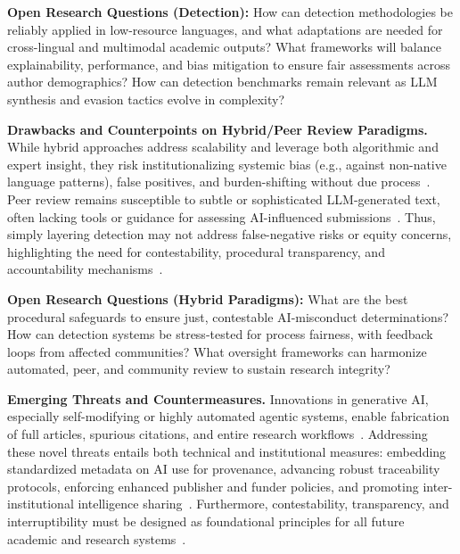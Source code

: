\documentclass[sigconf]{acmart}
\begin{document}
\textbf{Open Research Questions (Detection):}
How can detection methodologies be reliably applied in low-resource languages, and what adaptations are needed for cross-lingual and multimodal academic outputs?
What frameworks will balance explainability, performance, and bias mitigation to ensure fair assessments across author demographics?
How can detection benchmarks remain relevant as LLM synthesis and evasion tactics evolve in complexity?

\textbf{Drawbacks and Counterpoints on Hybrid/Peer Review Paradigms.}
While hybrid approaches address scalability and leverage both algorithmic and expert insight, they risk institutionalizing systemic bias (e.g., against non-native language patterns), false positives, and burden-shifting without due process~\cite{ref14,ref41,ref97,ref100}. Peer review remains susceptible to subtle or sophisticated LLM-generated text, often lacking tools or guidance for assessing AI-influenced submissions~\cite{ref14,ref24,ref80,ref85,ref92,ref97,ref110}. Thus, simply layering detection may not address false-negative risks or equity concerns, highlighting the need for contestability, procedural transparency, and accountability mechanisms~\cite{ref24,ref41,ref80,ref100}.

\textbf{Open Research Questions (Hybrid Paradigms):}
What are the best procedural safeguards to ensure just, contestable AI-misconduct determinations?
How can detection systems be stress-tested for process fairness, with feedback loops from affected communities?
What oversight frameworks can harmonize automated, peer, and community review to sustain research integrity?

\textbf{Emerging Threats and Countermeasures.}
Innovations in generative AI, especially self-modifying or highly automated agentic systems, enable fabrication of full articles, spurious citations, and entire research workflows~\cite{ref2,ref13,ref14,ref37,ref38,ref39,ref61,ref92,ref93,ref95,ref97,ref98}. Addressing these novel threats entails both technical and institutional measures: embedding standardized metadata on AI use for provenance, advancing robust traceability protocols, enforcing enhanced publisher and funder policies, and promoting inter-institutional intelligence sharing~\cite{ref4,ref9,ref39,ref53,ref66,ref84,ref86,ref91,ref95,ref97,ref98,ref100,ref106,ref109,ref110}. Furthermore, contestability, transparency, and interruptibility must be designed as foundational principles for all future academic and research systems~\cite{ref24,ref61,ref64,ref95,ref110}.
\end{document}
